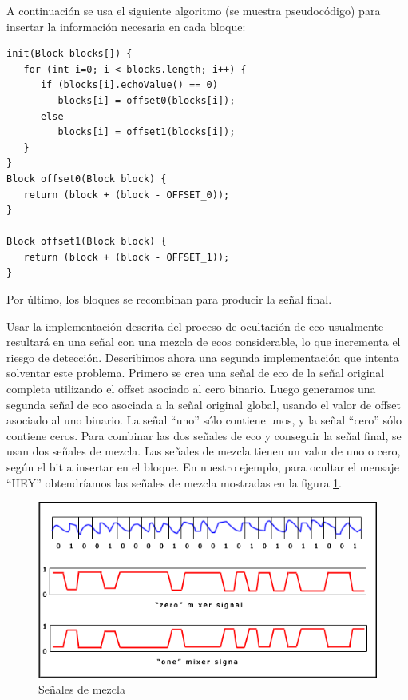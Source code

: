 \documentclass[12pt]{article}
\begin{document}
A continuación se usa el siguiente algoritmo (se muestra pseudocódigo) para insertar la información necesaria en cada bloque:

\begin{lstlisting}[style=mycode]
init(Block blocks[]) { 
   for (int i=0; i < blocks.length; i++) { 
      if (blocks[i].echoValue() == 0) 
         blocks[i] = offset0(blocks[i]); 
      else 
         blocks[i] = offset1(blocks[i]); 
   } 
}
Block offset0(Block block) { 
   return (block + (block - OFFSET_0)); 
}

Block offset1(Block block) { 
   return (block + (block - OFFSET_1)); 
}
\end{lstlisting}

Por último, los bloques se recombinan para producir la señal final.

Usar la implementación descrita del proceso de ocultación de eco usualmente resultará en una señal con una mezcla de ecos considerable, lo que incrementa el riesgo de detección. Describimos ahora una segunda implementación que intenta solventar este problema. Primero se crea una señal de eco de la señal original completa utilizando el offset asociado al cero binario. Luego generamos una segunda señal de eco asociada a la señal original global, usando el valor de offset asociado al uno binario. La señal ``uno'' sólo contiene unos, y la señal ``cero'' sólo contiene ceros. Para combinar las dos señales de eco y conseguir la señal final, se usan dos señales de mezcla. Las señales de mezcla tienen un valor de uno o cero, según el bit a insertar en el bloque. En nuestro ejemplo, para ocultar el mensaje ``HEY'' obtendríamos las señales de mezcla mostradas en la figura \ref{mixersignals}.

\begin{figure}
  \centering
    \includegraphics[width=\textwidth]{img/mixersignals}
  \caption{Señales de mezcla}
  \label{mixersignals}
\end{figure}
\end{document}
